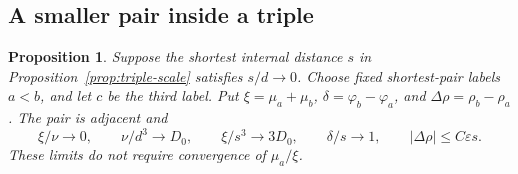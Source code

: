 \documentclass[11pt,a4paper]{article}
\numberwithin{equation}{section}
\newtheorem{proposition}[theorem]{Proposition}
\theoremstyle{remark}
\newcommand{\eps}{\varepsilon}
\begin{document}
\subsection{A smaller pair inside a triple}
\begin{proposition}\label{prop:nested-scale}
Suppose the shortest internal distance $s$ in Proposition~\ref{prop:triple-scale} satisfies $s/d\to0$. Choose fixed shortest-pair labels $a<b$, and let $c$ be the third label. Put $\xi=\mu_a+\mu_b$, $\delta=\varphi_b-\varphi_a$, and $\Delta\rho=\rho_b-\rho_a$. The pair is adjacent and
\begin{equation}\label{eq:nested-scale}
 \xi/\nu\to0,\qquad \nu/d^3\to D_0,\qquad \xi/s^3\to3D_0,
 \qquad \delta/s\to1,\qquad |\Delta\rho|\le C\eps s.
\end{equation}
These limits do not require convergence of $\mu_a/\xi$.
\end{proposition}
\end{document}
